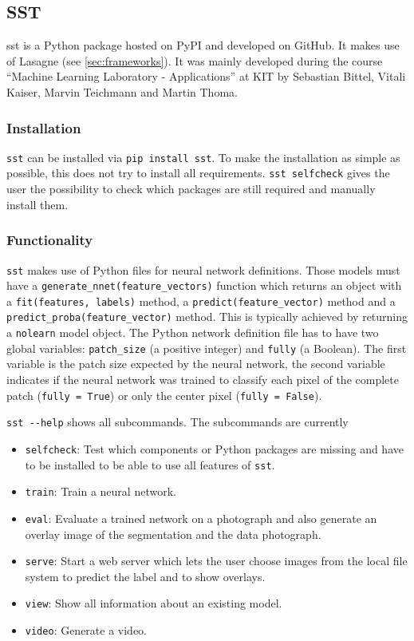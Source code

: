 
\subsection{SST}\label{sec:sst}
\Gls{sst} is a Python package hosted on \gls{PyPI} and developed on GitHub.
It makes use of Lasagne (see \cref{sec:frameworks}). It was mainly developed
during the course \enquote{Machine Learning Laboratory - Applications} at
KIT by Sebastian Bittel, Vitali Kaiser, Marvin Teichmann and Martin Thoma.

\subsubsection{Installation}
\verb+sst+ can be installed via \verb+pip install sst+. To make the
installation as simple as possible, this does not try to install all
requirements.
\verb+sst selfcheck+ gives the user the possibility to check which packages
are still required and manually install them.

\subsubsection{Functionality}
\verb+sst+ makes use of Python files for neural network definitions. Those
models must have a \verb+generate_nnet(feature_vectors)+ function which
returns an object with a \verb+fit(features, labels)+ method, a
\verb+predict(feature_vector)+ method and a
\verb+predict_proba(feature_vector)+ method. This is typically achieved by
returning a \verb+nolearn+ model object. The Python network definition file
has to have two global variables: \verb+patch_size+ (a positive integer) and
\verb+fully+ (a Boolean). The first variable is the patch size expected by the
neural network, the second variable indicates if the neural network was trained
to classify each pixel of the complete patch (\verb+fully = True+) or only the
center pixel (\verb+fully = False+).

\verb+sst --help+ shows all subcommands. The subcommands are currently

\begin{itemize}
    \item \verb+selfcheck+: Test which components or Python packages are
                            missing and have to be installed to be able to use
                            all features of \verb+sst+.
    \item \verb+train+: Train a neural network.
    \item \verb+eval+: Evaluate a trained network on a photograph and also
                       generate an overlay image of the segmentation and the
                       data photograph.
    \item \verb+serve+: Start a web server which lets the user choose images
                        from the local file system to predict the label and to
                        show overlays.
    \item \verb+view+: Show all information about an existing model.
    \item \verb+video+: Generate a video.
\end{itemize}